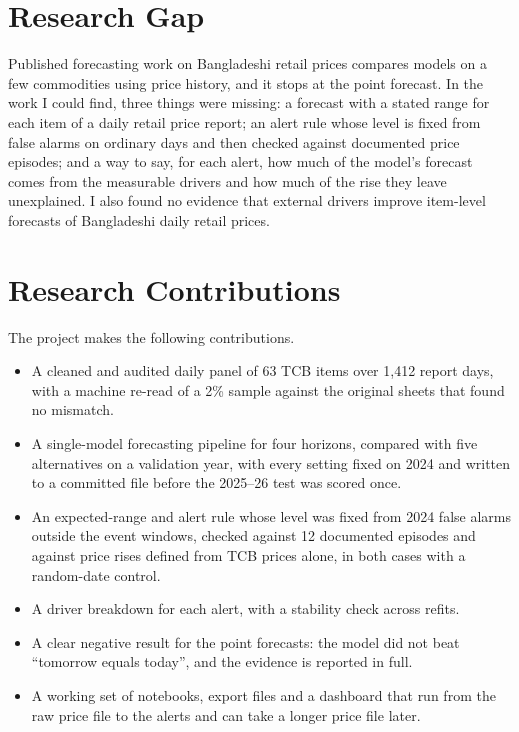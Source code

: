 \begin{table}[H]\centering\small
\caption[Summary of the literature used]{Summary of the literature used in this report.}\label{tab:lit}

\end{table}

\section{Research Gap}
Published forecasting work on Bangladeshi retail prices compares models on a few commodities using price history, and it stops at the point forecast. In the work I could find, three things were missing: a forecast with a stated range for each item of a daily retail price report; an alert rule whose level is fixed from false alarms on ordinary days and then checked against documented price episodes; and a way to say, for each alert, how much of the model's forecast comes from the measurable drivers and how much of the rise they leave unexplained. I also found no evidence that external drivers improve item-level forecasts of Bangladeshi daily retail prices.

\section{Research Contributions}
The project makes the following contributions.
\begin{itemize}
    \item A cleaned and audited daily panel of 63 TCB items over 1,412 report days, with a machine re-read of a 2\% sample against the original sheets that found no mismatch.
    \item A single-model forecasting pipeline for four horizons, compared with five alternatives on a validation year, with every setting fixed on 2024 and written to a committed file before the 2025--26 test was scored once.
    \item An expected-range and alert rule whose level was fixed from 2024 false alarms outside the event windows, checked against 12 documented episodes and against price rises defined from TCB prices alone, in both cases with a random-date control.
    \item A driver breakdown for each alert, with a stability check across refits.
    \item A clear negative result for the point forecasts: the model did not beat ``tomorrow equals today'', and the evidence is reported in full.
    \item A working set of notebooks, export files and a dashboard that run from the raw price file to the alerts and can take a longer price file later.
\end{itemize}
